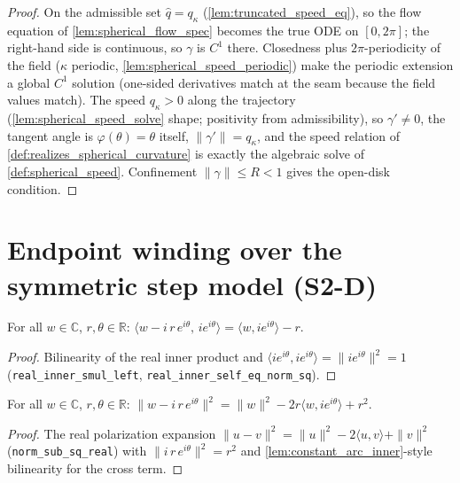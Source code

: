 \begin{proof}

\leanok
  On the admissible set $\hat q=q_\kappa$ (\cref{lem:truncated_speed_eq}), so the flow
  equation of \cref{lem:spherical_flow_spec} becomes the true ODE on $[0,2\pi]$; the
  right-hand side is continuous, so $\gamma$ is $C^1$ there. Closedness plus
  $2\pi$-periodicity of the field ($\kappa$ periodic,
  \cref{lem:spherical_speed_periodic}) make the periodic extension a global $C^1$
  solution (one-sided derivatives match at the seam because the field values match).
  The speed $q_\kappa>0$ along the trajectory (\cref{lem:spherical_speed_solve} shape;
  positivity from admissibility), so $\gamma'\ne0$, the tangent angle is $\varphi(\theta)=
  \theta$ itself, $\|\gamma'\|=q_\kappa$, and the speed relation of
  \cref{def:realizes_spherical_curvature} is exactly the algebraic solve of
  \cref{def:spherical_speed}. Confinement $\|\gamma\|\le R<1$ gives the open-disk condition.
\end{proof}

\section{Endpoint winding over the symmetric step model (S2-D)}
\label{sec:sphere_winding}

\begin{lemma}
  \label{lem:constant_arc_inner}
  For all $w\in\mathbb C$, $r,\theta\in\mathbb R$:
  $\bigl\langle w-i\,r\,e^{i\theta},\,i e^{i\theta}\bigr\rangle
   =\langle w,ie^{i\theta}\rangle-r$.
\end{lemma}

\begin{proof}

\leanok
  Bilinearity of the real inner product and
  $\langle ie^{i\theta},ie^{i\theta}\rangle=\|ie^{i\theta}\|^2=1$
  (\texttt{real\_inner\_smul\_left}, \texttt{real\_inner\_self\_eq\_norm\_sq}).
\end{proof}

\begin{lemma}
  \label{lem:constant_arc_norm_sq}
  For all $w\in\mathbb C$, $r,\theta\in\mathbb R$:
  $\|w-i\,r\,e^{i\theta}\|^2=\|w\|^2-2r\langle w,ie^{i\theta}\rangle+r^2$.
\end{lemma}

\begin{proof}

\leanok
  The real polarization expansion $\|u-v\|^2=\|u\|^2-2\langle u,v\rangle+\|v\|^2$
  (\texttt{norm\_sub\_sq\_real}) with $\|i\,r\,e^{i\theta}\|^2=r^2$ and
  \cref{lem:constant_arc_inner}-style bilinearity for the cross term.
\end{proof}

